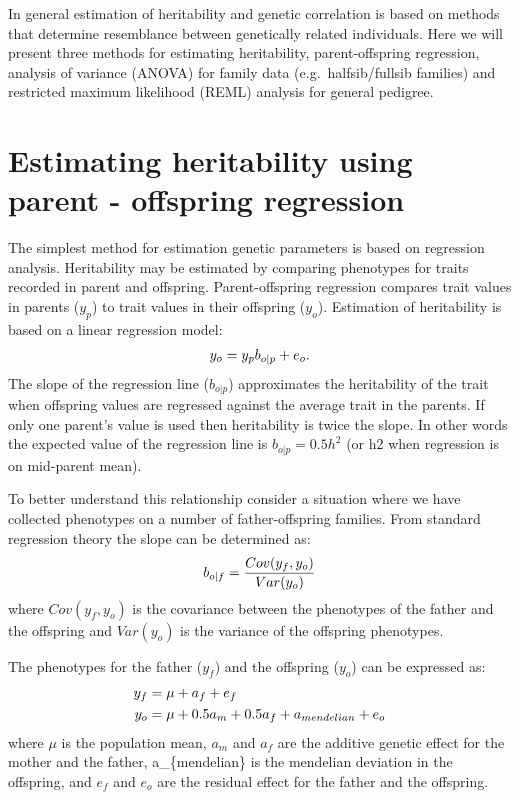 \documentclass[
]{book}
\begin{document}
In general estimation of heritability and genetic correlation is based on methods that determine resemblance
between genetically related individuals. Here we will present three methods for estimating heritability, parent-offspring regression, analysis of variance (ANOVA) for family data (e.g.~halfsib/fullsib families) and restricted maximum likelihood (REML) analysis for general pedigree.

\hypertarget{estimating-heritability-using-parent---offspring-regression}{%
\section{Estimating heritability using parent - offspring regression}\label{estimating-heritability-using-parent---offspring-regression}}

The simplest method for estimation genetic parameters is based on regression analysis.
Heritability may be estimated by comparing phenotypes for traits recorded in parent and offspring. Parent-offspring regression compares trait values in parents (\(y_p\)) to trait values in their offspring (\(y_o\)). Estimation of heritability is based on a linear regression model:
\begin{align}
            y_o &= y_p b_{o|p}+e_o. \notag \\
\end{align}
The slope of the regression line (\(b_{o|p}\)) approximates the heritability of the trait when offspring values are regressed against the average trait in the parents. If only one parent's value is used then heritability is twice the slope. In other words the expected value of the regression line is \(b_{o|p} = 0.5h^2\) (or h2 when
regression is on mid-parent mean).

To better understand this relationship consider a situation
where we have collected phenotypes on a number of father-offspring families.
From standard regression theory the slope can be determined as:
\begin{align}
            b_{o|f} &= \frac{Cov(y_f,y_o)}{Var(y_o)} \notag \\
\end{align}
where \(Cov(y_f,y_o)\) is the covariance between the phenotypes of the father and the offspring and \(Var(y_o)\) is the variance of the offspring phenotypes.

The phenotypes for the father (\(y_f\)) and the offspring (\(y_o\)) can be expressed as:
\begin{align}
            y_f &= \mu+a_f+e_f \notag \\
            y_o &= \mu+0.5a_m+0.5a_f+a_{mendelian}+e_o \notag
\end{align}
where \(\mu\) is the population mean, \(a_m\) and \(a_f\) are the additive genetic effect for the mother and the father, a\_\{mendelian\} is the mendelian deviation in the offspring, and \(e_f\) and \(e_o\) are the residual effect for the father and the offspring.
\end{document}

